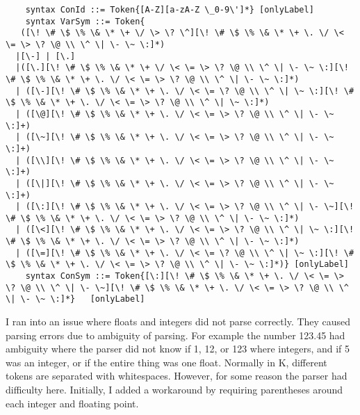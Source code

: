 \begin{lstlisting}
    syntax ConId ::= Token{[A-Z][a-zA-Z \_0-9\']*} [onlyLabel]
    syntax VarSym ::= Token{
   ([\! \# \$ \% \& \* \+ \/ \> \? \^][\! \# \$ \% \& \* \+ \. \/ \< \= \> \? \@ \\ \^ \| \- \~ \:]*)
  |[\-] | [\.]
  |([\.][\! \# \$ \% \& \* \+ \/ \< \= \> \? \@ \\ \^ \| \- \~ \:][\! \# \$ \% \& \* \+ \. \/ \< \= \> \? \@ \\ \^ \| \- \~ \:]*)
  | ([\-][\! \# \$ \% \& \* \+ \. \/ \< \= \? \@ \\ \^ \| \~ \:][\! \# \$ \% \& \* \+ \. \/ \< \= \> \? \@ \\ \^ \| \~ \:]*)
  | ([\@][\! \# \$ \% \& \* \+ \. \/ \< \= \> \? \@ \\ \^ \| \- \~ \:]+)
  | ([\~][\! \# \$ \% \& \* \+ \. \/ \< \= \> \? \@ \\ \^ \| \- \~ \:]+)
  | ([\\][\! \# \$ \% \& \* \+ \. \/ \< \= \> \? \@ \\ \^ \| \- \~ \:]+)
  | ([\|][\! \# \$ \% \& \* \+ \. \/ \< \= \> \? \@ \\ \^ \| \- \~ \:]+)
  | ([\:][\! \# \$ \% \& \* \+ \. \/ \< \= \> \? \@ \\ \^ \| \- \~][\! \# \$ \% \& \* \+ \. \/ \< \= \> \? \@ \\ \^ \| \- \~ \:]*)
  | ([\<][\! \# \$ \% \& \* \+ \. \/ \< \= \> \? \@ \\ \^ \| \~ \:][\! \# \$ \% \& \* \+ \. \/ \< \= \> \? \@ \\ \^ \| \- \~ \:]*)
  | ([\=][\! \# \$ \% \& \* \+ \. \/ \< \= \? \@ \\ \^ \| \~ \:][\! \# \$ \% \& \* \+ \. \/ \< \= \> \? \@ \\ \^ \| \- \~ \:]*)} [onlyLabel]
    syntax ConSym ::= Token{[\:][\! \# \$ \% \& \* \+ \. \/ \< \= \> \? \@ \\ \^ \| \- \~][\! \# \$ \% \& \* \+ \. \/ \< \= \> \? \@ \\ \^ \| \- \~ \:]*}   [onlyLabel]
\end{lstlisting}
I ran into an issue where floats and integers did not parse correctly. They caused parsing errors due to ambiguity of parsing. For example the number 123.45 had ambiguity where the parser did not know if 1, 12, or 123 where integers, and if 5 was an integer, or if the entire thing was one float. Normally in K, different tokens are separated with whitespaces. However, for some reason the parser had difficulty here. Initially, I added a workaround by requiring parentheses around each integer and floating point.
